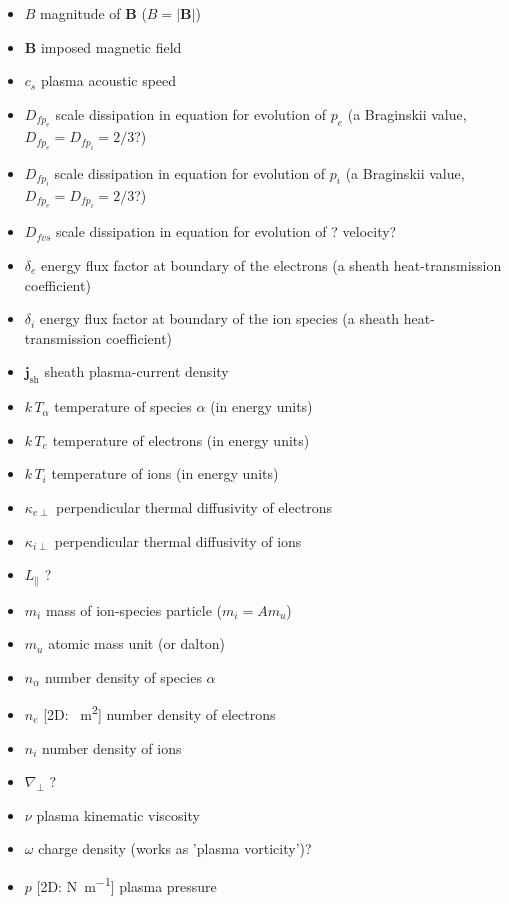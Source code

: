 \documentclass[12pt]{article}
\begin{document}
\begin{itemize}
    \item $B$ magnitude of $\bm{B}$ ($B = |\bm{B}|$)
    \item $\bm{B}$ imposed magnetic field
    \item $c_s$ plasma acoustic speed
    \item $D_{fp_e}$ scale dissipation in equation for evolution of $p_e$ (a Braginskii value, $D_{fp_e} = D_{fp_i} = 2/3$?)
    \item $D_{fp_i}$ scale dissipation in equation for evolution of $p_i$ (a Braginskii value, $D_{fp_e} = D_{fp_i} = 2/3$?)
    \item $D_{fvs}$ scale dissipation in equation for evolution of ? velocity?
    \item $\delta_e$ energy flux factor at boundary of the electrons (a sheath heat-transmission coefficient)
    \item $\delta_i$ energy flux factor at boundary of the ion species (a sheath heat-transmission coefficient)
    \item $\bm{j}_\text{sh}$ sheath plasma-current density
    \item $k \, T_\alpha$ temperature of species $\alpha$ (in energy units)
    \item $k \, T_e$ temperature of electrons (in energy units)
    \item $k \, T_i$ temperature of ions (in energy units)
    \item $\kappa_{e\perp}$ perpendicular thermal diffusivity of electrons
    \item $\kappa_{i\perp}$ perpendicular thermal diffusivity of ions
    \item $L_\parallel$ ?
    \item $m_i$ mass of ion-species particle ($m_i = Am_u$)
    \item $m_u$ atomic mass unit (or dalton)
    \item $n_\alpha$ number density of species $\alpha$
    \item $n_e$ [2D: \unit{\per\square\metre}] number density of electrons
    \item $n_i$ number density of ions
    \item $\nabla_\perp$ ?
    \item $\nu$ plasma kinematic viscosity
    \item $\omega$ charge density (works as 'plasma vorticity')?
    \item $p$ [2D: \unit{\newton\per\metre}] plasma pressure

\end{itemize}
\end{document}

